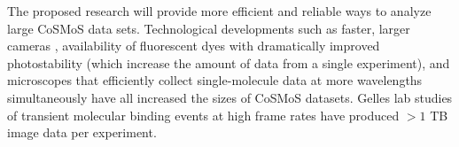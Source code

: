 The proposed research will provide more efficient and reliable ways to analyze large CoSMoS data sets. Technological developments such as faster, larger cameras \cite{Quan2011-cg}, availability of fluorescent dyes with dramatically improved photostability (which increase the amount of data from a single experiment), and microscopes that efficiently collect single-molecule data at more wavelengths simultaneously \cite{Friedman2006-kb} have all increased the sizes of CoSMoS datasets. Gelles lab studies of transient molecular binding events at high frame rates have produced $>1$ TB image data per experiment. 



\begin{comment}

methods experimentl data part
Discussion 
Remake figures with new program 6, 7, 5h, 3,5 update
Spreadsheets (scripts)
Spreadsheet key
Add missing references
literature review
get larry to read

--potentially after submission --
Software (is it required before submission?)
Installation ducomentation
Use documentation
More datasets
Use larry

--on publication --
Data archive

\end{comment}

